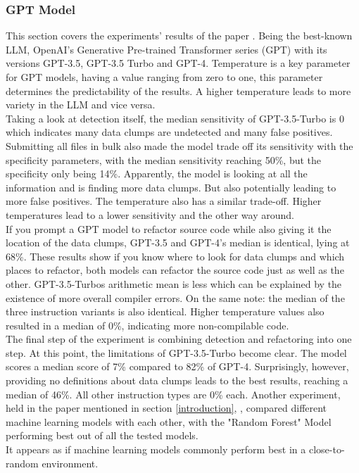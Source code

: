 \subsubsection{GPT Model}
This section covers the experiments' results of the paper \cite[AI-Driven Refactoring: A Pipeline for Identifying and Correcting Data Clumps in Git Repositories]{baumgartner2024aidriven}.
Being the best-known LLM, OpenAI's Generative Pre-trained Transformer series (GPT) with its versions GPT-3.5, GPT-3.5 Turbo and GPT-4.
Temperature is a key parameter for GPT models, having a value ranging from zero to one, this parameter determines the predictability of the results. 
A higher temperature leads to more variety in the LLM and vice versa.\\
Taking a look at detection itself, the median sensitivity of GPT-3.5-Turbo is 0 which indicates many data clumps are undetected and many false positives. 
Submitting all files in bulk also made the model trade off its sensitivity with the specificity parameters, with the median sensitivity reaching 50\%, but the specificity only being 14\%. 
Apparently, the model is looking at all the information and is finding more data clumps. But also potentially leading to more false positives.
The temperature also has a similar trade-off. Higher temperatures lead to a lower sensitivity and the other way around.\\
If you prompt a GPT model to refactor source code while also giving it the location of the data clumps, GPT-3.5 and GPT-4's median is identical, lying at 68\%.
These results show if you know where to look for data clumps and which places to refactor, both models can refactor the source code just as well as the other.
GPT-3.5-Turbos arithmetic mean is less which can be explained by the existence of more overall compiler errors.
On the same note: the median of the three instruction variants is also identical.
Higher temperature values also resulted in a median of 0\%, indicating more non-compilable code.\\
The final step of the experiment is combining detection and refactoring into one step. At this point, the limitations of GPT-3.5-Turbo become clear. The model scores a median score of 7\% compared to 82\% of GPT-4.
Surprisingly, however, providing no definitions about data clumps leads to the best results, reaching a median of 46\%. 
All other instruction types are 0\% each.
Another experiment, held in the paper mentioned in section \ref{introduction}, \cite[The effectiveness of supervised machine learning algorithms in predicting software refactoring]{aniche2020effectiveness}, compared different machine learning models with each other, with the "Random Forest" Model performing best out of all the tested models.\\
It appears as if machine learning models commonly perform best in a close-to-random environment.
